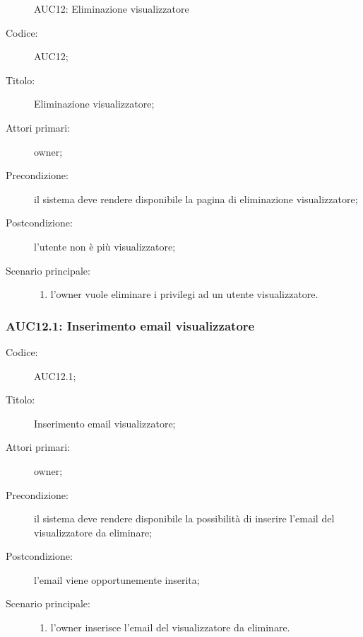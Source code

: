 \documentclass[../../../analisi-dei-requisiti.tex]{subfiles}
\begin{document}
\begin{figure}[H]
  \centering
  \caption{AUC12: Eliminazione visualizzatore}%
  \label{fig:AUC12}
\end{figure}

\begin{description}
  \item[Codice:] AUC12;
  \item[Titolo:] Eliminazione visualizzatore;
  \item[Attori primari:] owner;
  \item[Precondizione:] il sistema deve rendere disponibile la pagina di eliminazione visualizzatore;
  \item[Postcondizione:] l'utente non è più visualizzatore;
  \item[Scenario principale:]
        \begin{enumerate}
          \item l'owner vuole eliminare i privilegi ad un utente visualizzatore.
        \end{enumerate}
\end{description}

\subsubsection{AUC12.1: Inserimento email visualizzatore}%
\label{subs:AUC12.1}
\begin{description}
  \item[Codice:] AUC12.1;
  \item[Titolo:] Inserimento email visualizzatore;
  \item[Attori primari:] owner;
  \item[Precondizione:] il sistema deve rendere disponibile la possibilità di inserire l'email del visualizzatore da eliminare;
  \item[Postcondizione:] l'email viene opportunemente inserita;
  \item[Scenario principale:]
        \begin{enumerate}
          \item l'owner inserisce l'email del visualizzatore da eliminare.
        \end{enumerate}
\end{description}
\end{document}
